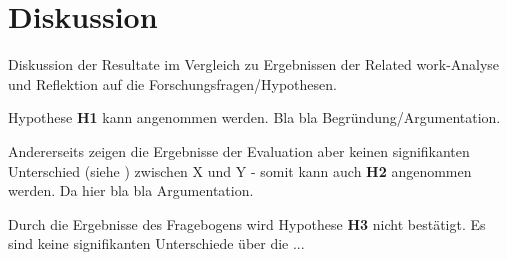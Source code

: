 \section{Diskussion}
Diskussion der Resultate im Vergleich zu Ergebnissen der Related work-Analyse und Reflektion auf die Forschungsfragen/Hypothesen.

Hypothese \textbf{H1} kann angenommen werden. Bla bla Begründung/Argumentation.

Andererseits zeigen die Ergebnisse der Evaluation aber keinen signifikanten Unterschied (siehe \cite{field}) zwischen X und Y - somit kann auch \textbf{H2} angenommen werden. Da hier bla bla Argumentation.

Durch die Ergebnisse des Fragebogens wird Hypothese \textbf{H3} nicht bestätigt. Es sind keine signifikanten Unterschiede über die ... 


